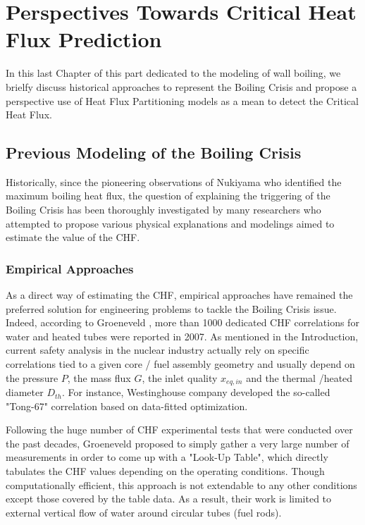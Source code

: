 
\chapter{Perspectives Towards Critical Heat Flux Prediction} %

\label{ch:to_CHF} %


In this last Chapter of this part dedicated to the modeling of wall boiling, we brielfy discuss historical approaches to represent the Boiling Crisis and propose a perspective use of Heat Flux Partitioning models as a mean to detect the Critical Heat Flux.


\section{Previous Modeling of the Boiling Crisis}

Historically, since the pioneering observations of Nukiyama \cite{nukiyama} who identified the maximum boiling heat flux, the question of explaining the triggering of the Boiling Crisis has been thoroughly investigated by many researchers who attempted to propose various physical explanations and modelings aimed to estimate the value of the CHF.


\subsection{Empirical Approaches}

As a direct way of estimating the CHF, empirical approaches have remained the preferred solution for engineering problems to tackle the Boiling Crisis issue. Indeed, according to Groeneveld \cite{groenveld}, more than 1000 dedicated CHF correlations for water and heated tubes were reported in 2007. As mentioned in the Introduction, current safety analysis in the nuclear industry actually rely on specific correlations tied to a given core / fuel assembly geometry and usually depend on the pressure $P$, the mass flux $G$, the inlet quality $x_{eq,in}$ and the thermal /heated diameter $D_{th}$. For instance, Westinghouse company developed the so-called "Tong-67" correlation \cite{tong_67} based on data-fitted optimization. 

\npar

Following the huge number of CHF experimental tests that were conducted over the past decades, Groeneveld \etal \cite{groeneveld} proposed to simply gather a very large number of measurements in order to come up with a "Look-Up Table", which directly tabulates the CHF values depending on the operating conditions. Though computationally efficient, this approach is not extendable to any other conditions except those covered by the table data. As a result, their work is limited to external vertical flow of water around circular tubes (\eg fuel rods).  


